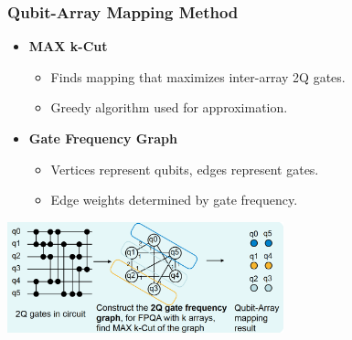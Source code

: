 \documentclass[18 pt]{beamer}
\begin{document}
\begin{frame}
    \frametitle{Qubit-Array Mapping Method}
    \begin{itemize}
        \item \textbf{MAX k-Cut}
        \begin{itemize}
            \item Finds mapping that maximizes inter-array 2Q gates.
            \item Greedy algorithm used for approximation.
        \end{itemize}
        \item \textbf{Gate Frequency Graph}
        \begin{itemize}
            \item Vertices represent qubits, edges represent gates.
            \item Edge weights determined by gate frequency.
        \end{itemize}
    \end{itemize}
    \begin{center}
        \includegraphics[width=0.6\textwidth]{max_cut.png}
    \end{center}
\end{frame}
\end{document}
